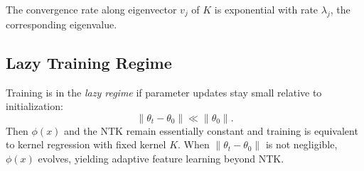 The convergence rate along eigenvector $v_j$ of $K$ is exponential with
rate $\lambda_j$, the corresponding eigenvalue.

%
%



\subsection{Lazy Training Regime}

Training is in the \emph{lazy regime} if parameter updates stay small relative to initialization:
\[
	\|\theta_t - \theta_0\| \ll \|\theta_0\|.
\]
Then $\phi(x)$ and the NTK remain essentially constant and training is equivalent to kernel regression with fixed kernel $K$. When $\|\theta_t-\theta_0\|$ is not negligible, $\phi(x)$ evolves, yielding adaptive feature learning beyond NTK.


